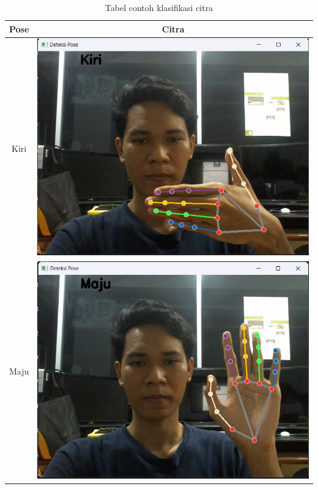 \newpage

\begin{table}[H]
\centering
    \caption{Tabel contoh klasifikasi citra}
    \label{tbl:contoh-klasifikasi}
    \begin{tabular}{|c|c|}
        \hline
        Pose                & Citra              \\ \hline
        Kiri                & \includegraphics[scale=0.33]{gambar/bab3/Kiri.png}   \\ \hline
        Maju                & \includegraphics[scale=0.33]{gambar/bab3/Maju.png}   \\ \hline

\end{tabular}
\end{table}

